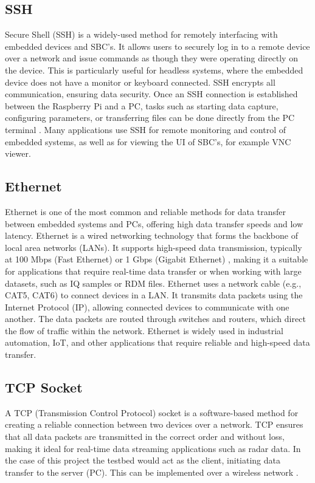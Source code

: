 \subsection{SSH}
Secure Shell (SSH) is a widely-used method for remotely interfacing with embedded devices and SBC's. It allows users to securely log in to a remote device over a network and issue commands as though they were operating directly on the device. This is particularly useful for headless systems, where the embedded device does not have a monitor or keyboard connected. SSH encrypts all communication, ensuring data security. Once an SSH connection is established between the Raspberry Pi and a PC, tasks such as starting data capture, configuring parameters, or transferring files can be done directly from the PC terminal \cite{SSHOverview}. Many applications use SSH for remote monitoring and control of embedded systems, as well as for viewing the UI of SBC's, for example VNC viewer.


\subsection{Ethernet}
Ethernet is one of the most common and reliable methods for data transfer between embedded systems and PCs, offering high data transfer speeds and low latency. Ethernet is a wired networking technology that forms the backbone of local area networks (LANs). It supports high-speed data transmission, typically at 100 Mbps (Fast Ethernet) or 1 Gbps (Gigabit Ethernet) \cite{rpi5_wifi}, making it a suitable for applications that require real-time data transfer or when working with large datasets, such as IQ samples or RDM files. Ethernet uses a network cable (e.g., CAT5, CAT6) to connect devices in a LAN. It transmits data packets using the Internet Protocol (IP), allowing connected devices to communicate with one another. The data packets are routed through switches and routers, which direct the flow of traffic within the network. Ethernet is widely used in industrial automation, IoT, and other applications that require reliable and high-speed data transfer.

\subsection{TCP Socket}
A TCP (Transmission Control Protocol) socket is a software-based method for creating a reliable connection between two devices over a network. TCP ensures that all data packets are transmitted in the correct order and without loss, making it ideal for real-time data streaming applications such as radar data. In the case of this project the testbed would act as the client, initiating data transfer to the server (PC). This can be implemented over a wireless network \cite{TCPoverview}.

